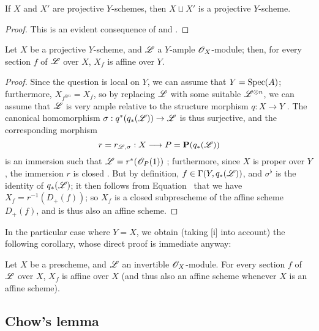 \begin{prop}[5.5.6]
\label{2.5.5.6}
If $X$ and $X'$ are projective $Y$-schemes, then $X\sqcup X'$ is a projective $Y$-scheme.
\end{prop}

\begin{proof}
\label{proof-2.5.5.6}
This is an evident consequence of  and .
\end{proof}

\begin{prop}[5.5.7]
\label{2.5.5.7}
Let $X$ be a projective $Y$-scheme, and $\mathscr{L}$ a $Y$-ample $\mathscr{O}_X$-module; then, for every section $f$ of $\mathscr{L}$ over $X$, $X_f$ is affine over $Y$.
\end{prop}

\begin{proof}
\label{proof-2.5.5.6}
Since the question is local on $Y$, we can assume that $Y={\mathop{\mathrm{Spec}}\nolimits}(A)$; furthermore, $X_{f^{\otimes n}}=X_f$, so by replacing $\mathscr{L}$ with some suitable $\mathscr{L}^{\otimes n}$, we can assume that $\mathscr{L}$ is very ample relative to the structure morphism $q:X\to Y$ .
The canonical homomorphism $\sigma:q^*(q_*(\sh{L}))\to\sh{L}$ is thus surjective, and the corresponding morphism
\[
  r=r_{\sh{L},\sigma}:X\to P=\bb{P}(q_*(\sh{L}))
\]
is an immersion such that $\mathscr{L}=r^*(\mathscr{O}_P(1))$ ; furthermore, since $X$ is proper over $Y$, the immersion $r$ is closed .
But by definition, $f\in\Gamma(Y,q_*(\mathscr{L}))$, and $\sigma^\flat$ is the identity of $q_*(\mathscr{L})$; it then follows from Equation~ that we have $X_f=r^{-1}(D_+(f))$;
so $X_f$ is a closed subprescheme of the affine scheme $D_+(f)$, and is thus also an affine scheme.
\end{proof}

In the particular case where $Y=X$, we obtain (taking [i] into account) the following corollary, whose direct proof is immediate anyway:
\begin{cor}[5.5.8]
\label{2.5.5.8}
Let $X$ be a prescheme, and $\mathscr{L}$ an invertible $\mathscr{O}_X$-module.
For every section $f$ of $\mathscr{L}$ over $X$, $X_f$ is affine over $X$ (and thus also an affine scheme whenever $X$ is an affine scheme).
\end{cor}

\subsection{Chow's lemma}
\label{subsection:chows-lemma}

